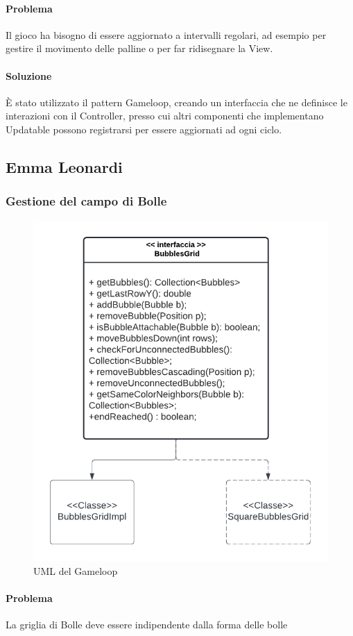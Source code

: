 \documentclass[a4paper,12pt]{report}
\begin{document}
\paragraph{Problema} Il gioco ha bisogno di essere aggiornato a intervalli regolari, ad esempio per gestire il movimento delle palline o per far ridisegnare la View.

\paragraph{Soluzione} È stato utilizzato il pattern Gameloop, creando un interfaccia che ne definisce le interazioni con il Controller, presso cui altri componenti che implementano Updatable possono registrarsi
per essere aggiornati ad ogni ciclo.

\subsection{Emma Leonardi}
\subsubsection{Gestione del campo di Bolle}

\begin{figure}[H]
	\centering{}
	\includegraphics[width=.7\textwidth]{img/bubble_grid.pdf}
	\caption{UML del Gameloop}
\end{figure}

\paragraph{Problema} La griglia di Bolle deve essere indipendente dalla forma delle bolle
\end{document}

